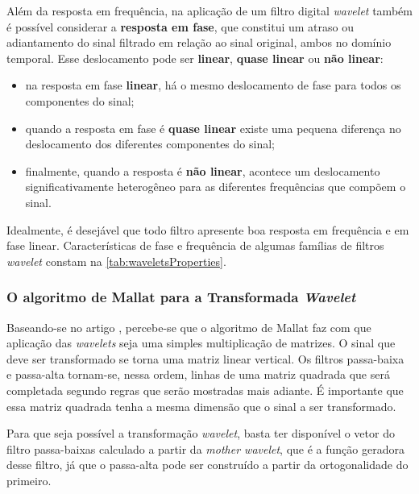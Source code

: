 			\par Além da resposta em frequência, na aplicação de um filtro digital \textit{wavelet} também é possível considerar a \textbf{resposta em fase}, que constitui um atraso ou adiantamento do sinal filtrado em relação ao sinal original, ambos no domínio temporal. Esse deslocamento pode ser \textbf{linear}, \textbf{quase linear} ou \textbf{não linear}: 
	
			\begin{itemize}
				\item na resposta em fase \textbf{linear}, há o mesmo deslocamento de fase para todos os componentes do sinal;
				\item quando a resposta em fase é \textbf{quase linear} existe uma pequena diferença no deslocamento dos diferentes componentes do sinal;
				\item finalmente, quando a resposta é \textbf{não linear}, acontece um deslocamento significativamente heterogêneo para as diferentes frequências que compõem o sinal.
			\end{itemize}
			
			\par Idealmente, é desejável que todo filtro apresente boa resposta em frequência e em fase linear. Características de fase e frequência de algumas famílias de filtros \textit{wavelet} constam na \autoref{tab:waveletsProperties}.
			
			
	
		\subsubsection{O algoritmo de Mallat para a Transformada \textit{Wavelet}}
			\par Baseando-se no artigo \cite{7079589}, percebe-se que o algoritmo de Mallat faz com que aplicação das \textit{wavelets} seja uma simples multiplicação de matrizes. O sinal que deve ser transformado se torna uma matriz linear vertical. Os filtros passa-baixa e passa-alta tornam-se, nessa ordem, linhas de uma matriz quadrada que será completada segundo regras que serão mostradas mais adiante. É importante que essa matriz quadrada tenha a mesma dimensão que o sinal a ser transformado.
			
			\par Para que seja possível a transformação \textit{wavelet}, basta ter disponível o vetor do filtro passa-baixas calculado a partir da \textit{mother wavelet}, que é a função geradora desse filtro, já que o passa-alta pode ser construído a partir da ortogonalidade do primeiro.
			
